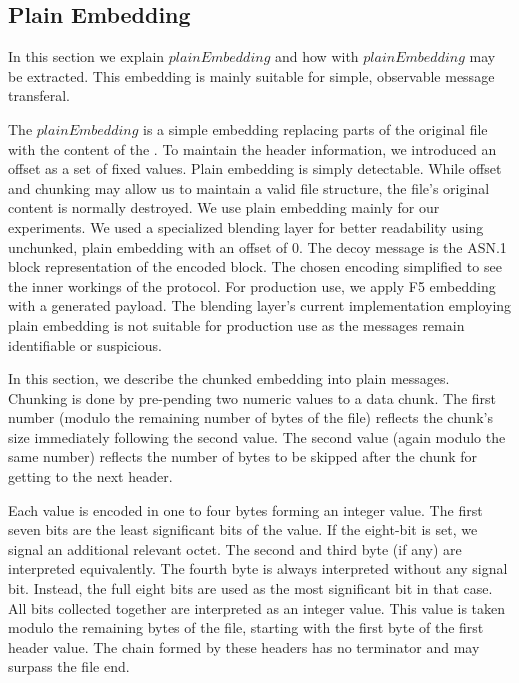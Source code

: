 \subsection{Plain Embedding}
In this section we explain $plainEmbedding$ and how \VortexMessages{} with $plainEmbedding$ may be extracted. This embedding is mainly suitable for simple, observable message transferal.

The $plainEmbedding$ is a simple embedding replacing parts of the original file with the content of the \VortexMessage. To maintain the header information, we introduced an offset as a set of fixed values. Plain embedding is simply detectable. While offset and chunking may allow us to maintain a valid file structure, the file's original content is normally destroyed. We use plain embedding mainly for our experiments. We used a specialized blending layer for better readability using unchunked, plain embedding with an offset of $0$. The decoy message is the ASN.1 block representation of the encoded block. The chosen encoding simplified to see the inner workings of the protocol. For production use, we apply F5 embedding with a generated payload. The blending layer's current implementation employing plain embedding is not suitable for production use as the messages remain identifiable or suspicious.%

\label{sec:chunkingPlain}
In this section, we describe the chunked embedding into plain messages. Chunking is done by pre-pending two numeric values to a data chunk. The first number (modulo the remaining number of bytes of the file) reflects the chunk's size immediately following the second value. The second value (again modulo the same number)  reflects the number of bytes to be skipped after the chunk for getting to the next header.

Each value is encoded in one to four bytes forming an integer value. The first seven bits are the least significant bits of the value. If the eight-bit is set, we signal an additional relevant octet. The second and third byte (if any) are interpreted equivalently. The fourth byte is always interpreted without any signal bit. Instead, the full eight bits are used as the most significant bit in that case. All bits collected together are interpreted as an integer value. This value is taken modulo the remaining bytes of the file, starting with the first byte of the first header value. The chain formed by these headers has no terminator and may surpass the file end.

